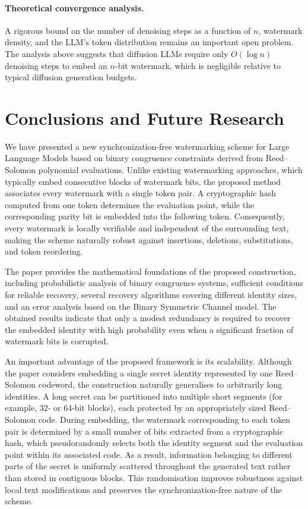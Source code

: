 \documentclass[a4paper,11pt]{llncs}
\begin{document}
\paragraph{Theoretical convergence analysis.}
A rigorous bound on the number of denoising steps as a function of
$n$, watermark density, and the LLM's token distribution remains
an important open problem. The analysis above suggests that
diffusion LLMs require only $O(\log n)$ denoising steps to embed
an $n$-bit watermark, which is negligible relative to typical
diffusion generation budgets.



\section{Conclusions and Future Research}

We have presented a new synchronization-free watermarking scheme for Large Language Models based on binary congruence constraints derived from Reed--Solomon polynomial evaluations. Unlike existing watermarking approaches, which typically embed consecutive blocks of watermark bits, the proposed method associates every watermark with a single token pair. A cryptographic hash computed from one token determines the evaluation point, while the corresponding parity bit is embedded into the following token. Consequently, every watermark is locally verifiable and independent of the surrounding text, making the scheme naturally robust against insertions, deletions, substitutions, and token reordering.

The paper provides the mathematical foundations of the proposed construction, including probabilistic analysis of binary congruence systems, sufficient conditions for reliable recovery, several recovery algorithms covering different identity sizes, and an error analysis based on the Binary Symmetric Channel model. The obtained results indicate that only a modest redundancy is required to recover the embedded identity with high probability even when a significant fraction of watermark bits is corrupted.

An important advantage of the proposed framework is its scalability. Although the paper considers embedding a single secret identity represented by one Reed--Solomon codeword, the construction naturally generalises to arbitrarily long identities. A long secret can be partitioned into multiple short segments (for example, 32- or 64-bit blocks), each protected by an appropriately sized Reed--Solomon code. During embedding, the watermark corresponding to each token pair is determined by a small number of bits extracted from a cryptographic hash, which pseudorandomly selects both the identity segment and the evaluation point within its associated code. As a result, information belonging to different parts of the secret is uniformly scattered throughout the generated text rather than stored in contiguous blocks. This randomisation improves robustness against local text modifications and preserves the synchronization-free nature of the scheme.
\end{document}
